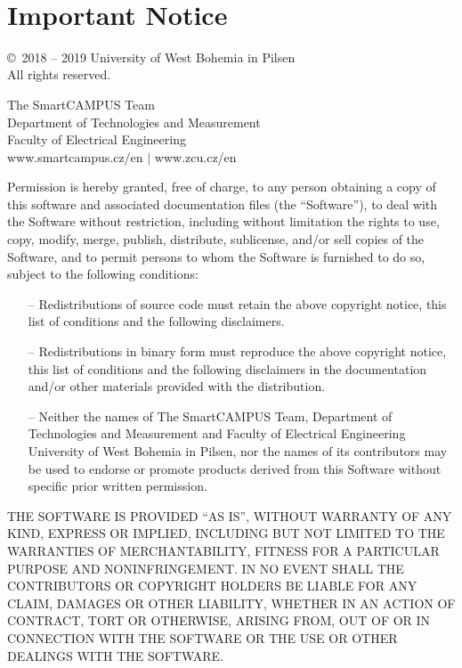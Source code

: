 %
%
%

\clearpage
\pagestyle{empty} 

~

\vfill

\section*{Important Notice}

\copyright ~2018 -- 2019 University of West Bohemia in Pilsen\\
All rights reserved.

The SmartCAMPUS Team\\
Department of Technologies and Measurement\\
Faculty of Electrical Engineering\\
www.smartcampus.cz/en $\mid$ www.zcu.cz/en


Permission is hereby granted, free of charge, to any person obtaining a copy of this software and associated documentation files (the “Software”), to deal with the Software without restriction, including without limitation the rights to use, copy, modify, merge, publish, distribute, sublicense, and/or sell copies of the Software, and to permit persons to whom the Software is furnished to do so, subject to the following conditions:

\begin{itemize}
    \item[--] Redistributions of source code must retain the above copyright notice, this list of conditions and the following disclaimers.
    \item[--] Redistributions in binary form must reproduce the above copyright notice, this list of conditions and the following disclaimers in the documentation and/or other materials provided with the distribution.
    \item[--] Neither the names of The SmartCAMPUS Team, Department of Technologies and Measurement and Faculty of Electrical Engineering University of West Bohemia in Pilsen, nor the names of its contributors may be used to endorse or promote products derived from this Software without specific prior written permission. 
\end{itemize}
THE SOFTWARE IS PROVIDED “AS IS”, WITHOUT WARRANTY OF ANY KIND, EXPRESS OR IMPLIED, INCLUDING BUT NOT LIMITED TO THE WARRANTIES OF MERCHANTABILITY, FITNESS FOR A PARTICULAR PURPOSE AND NONINFRINGEMENT. IN NO EVENT SHALL THE CONTRIBUTORS OR COPYRIGHT HOLDERS BE LIABLE FOR ANY CLAIM, DAMAGES OR OTHER LIABILITY, WHETHER IN AN ACTION OF CONTRACT, TORT OR OTHERWISE, ARISING FROM, OUT OF OR IN CONNECTION WITH THE SOFTWARE OR THE USE OR OTHER DEALINGS WITH THE SOFTWARE. 


